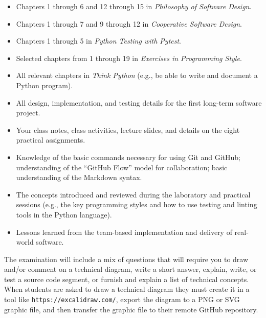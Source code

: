 \documentclass[11pt]{article}
\newcommand{\cooperative}{{\em Cooperative Software Design\/}}
\newcommand{\philosophy}{{\em Philosophy of Software Design\/}}
\newcommand{\thinkpython}{{\em Think Python\/}}
\newcommand{\programmingstyle}{{\em Exercises in Programming Style\/}}
\newcommand{\pytest}{{\em Python Testing with Pytest\/}}
\newcommand{\url}[1]{\lstinline{#1}}
\begin{document}
\vspace*{-.5em}
\begin{itemize}

  \itemsep 0.05in

  \item Chapters 1 through 6 and 12 through 15 in \philosophy{}.

  \item Chapters 1 through 7 and 9 through 12 in \cooperative{}.

  \item Chapters 1 through 5 in \pytest{}.

  \item Selected chapters from 1 through 19 in \programmingstyle{}.

  \item All relevant chapters in \thinkpython{} (e.g., be able to write and
    document a Python program).

  \item All design, implementation, and testing details for the first long-term
    software project.

  \item Your class notes, class activities, lecture slides, and details on the
    eight practical assignments.

  \item Knowledge of the basic commands necessary for using Git and GitHub;
    understanding of the ``GitHub Flow'' model for collaboration; basic
    understanding of the Markdown syntax.

  \item The concepts introduced and reviewed during the laboratory and practical
    sessions (e.g., the key programming styles and how to use testing and
    linting tools in the Python language).

  \item Lessons learned from the team-based implementation and delivery of
    real-world software.

\end{itemize}
\vspace*{-.5em}

The examination will include a mix of questions that will require you to draw
and/or comment on a technical diagram, write a short answer, explain, write, or
test a source code segment, or furnish and explain a list of technical concepts.
%
When students are asked to draw a technical diagram they must create it in a
tool like \url{https://excalidraw.com/}, export the diagram to a PNG or SVG
graphic file, and then transfer the graphic file to their remote GitHub
repository.
\end{document}

